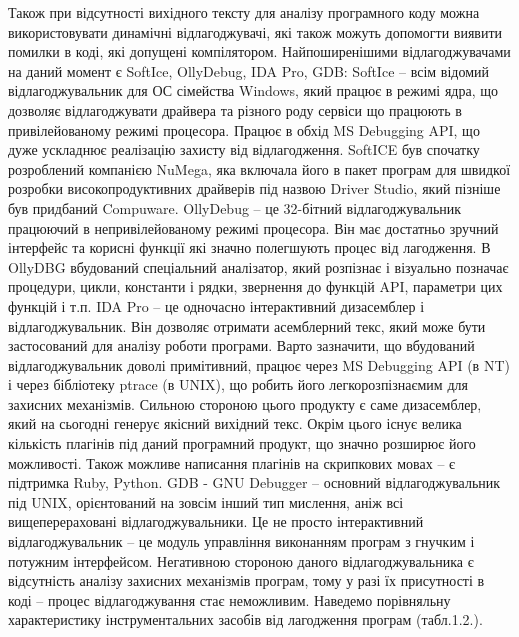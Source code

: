 \documentclass[oneside,final,14pt]{extreport}
\begin{document}
Також при відсутності вихідного тексту для аналізу програмного коду можна використовувати динамічні відлагоджувачі, які також можуть допомогти виявити помилки в коді, які допущені компілятором.
Найпоширенішими відлагоджувачами на даний момент є SoftIce, OllyDebug, IDA Pro, GDB:
SoftIce – всім відомий відлагоджувальник для ОС сімейства Windows, який працює в режимі ядра, що дозволяє відлагоджувати драйвера та різного роду сервіси що працюють в привілейованому режимі процесора. Працює в обхід MS Debugging API, що дуже ускладнює реалізацію захисту від відлагодження. SoftICE  був спочатку розроблений компанією NuMega, яка включала його в пакет програм для швидкої розробки високопродуктивних драйверів під назвою Driver Studio, який пізніше був придбаний Compuware.
OllyDebug – це 32-бітний відлагоджувальник працюючий в непривілейованому режимі процесора. Він має достатньо зручний інтерфейс та корисні функції які значно полегшують процес від лагодження.  В OllyDBG вбудований спеціальний аналізатор, який розпізнає і візуально позначає процедури, цикли, константи і рядки, звернення до функцій API, параметри цих функцій і т.п.
IDA Pro – це одночасно інтерактивний дизасемблер і відлагоджувальник. Він дозволяє отримати асемблерний текс, який може бути застосований для аналізу роботи програми. Варто зазначити, що вбудований відлагоджувальник доволі примітивний, працює через MS Debugging API (в NT) і через бібліотеку ptrace (в UNIX), що робить його легкорозпізнаємим для захисних механізмів. Сильною стороною цього продукту є саме дизасемблер, який на сьогодні генерує якісний вихідний текс. Окрім цього існує велика кількість плагінів під даний програмний продукт, що значно розширює його можливості. Також можливе написання плагінів на скрипкових мовах – є підтримка Ruby, Python.
GDB - GNU Debugger – основний відлагоджувальник під UNIX, орієнтований на зовсім інший тип мислення, аніж всі вищеперераховані відлагоджувальники. Це не просто інтерактивний відлагоджувальник – це модуль управління виконанням програм з гнучким і потужним інтерфейсом. Негативною стороною даного відлагоджувальника є відсутність аналізу захисних механізмів програм, тому у разі їх присутності в коді – процес відлагоджування стає неможливим.
Наведемо порівняльну характеристику інструментальних засобів  від лагодження програм (табл.1.2.).
\end{document}
